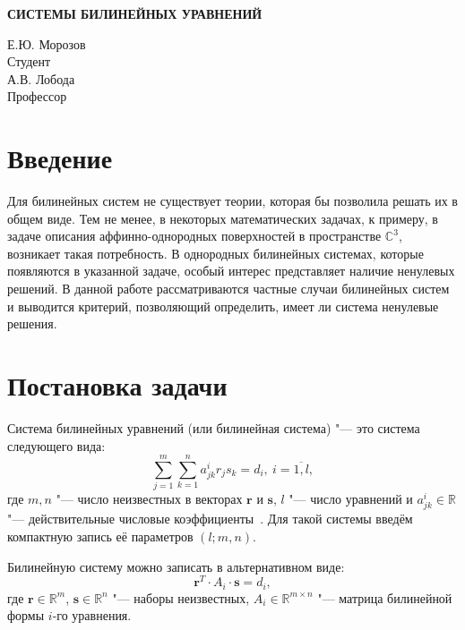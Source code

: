 \documentclass[10pt]{article}
\begin{document}

\begin{center}
\fontsize{11pt}{16pt}\selectfont\textbf{СИСТЕМЫ БИЛИНЕЙНЫХ УРАВНЕНИЙ}
\end{center}

\begin{flushright}
Е.Ю. Морозов \\ 
Студент \\
А.В. Лобода \\ 
Профессор
\end{flushright}

\section*{Введение}

Для билинейных систем не существует теории, которая бы позволила решать их в 
общем виде. Тем не менее, в некоторых математических задачах, к примеру, в задаче описания 
аффинно-однородных поверхностей в пространстве $ \mathbb{C}^3 $, возникает такая 
потребность. В однородных билинейных системах, которые появляются в указанной задаче, 
особый интерес представляет наличие ненулевых решений. В данной работе рассматриваются частные случаи билинейных систем и выводится критерий, позволяющий определить, имеет ли система ненулевые решения.

\section{Постановка задачи}
Система билинейных уравнений (или билинейная система) "--- это система следующего вида:
\begin{equation}\label{eq:bilinear_system}
	\sum_{j=1}^{m} \sum_{k=1}^{n} a^{i}_{jk} r_j s_k = d_i,~i=\overline{1,l},
\end{equation}
где $m,n$ "--- число неизвестных в векторах $\mathbf{r}$ и $\mathbf{s}$, $l$ "--- число уравнений и $a^i_{jk} \in \mathbb{R}$ "--- действительные числовые коэффициенты~\cite{stanford}. 
Для такой системы введём компактную запись её параметров $(l; m, n)$. 

Билинейную систему можно записать в альтернативном виде: 
\begin{equation}\label{eq:alternative_system}
	\mathbf{r}^T \cdot A_i \cdot \mathbf{s} = d_i,
\end{equation} 
где $\mathbf{r} \in \mathbb{R}^{m}$, $\mathbf{s} \in \mathbb{R}^{n}$ "--- наборы 
неизвестных, $A_i \in \mathbb{R}^{m \times n}$ "--- матрица билинейной формы $i$-го 
уравнения. 
\end{document}
